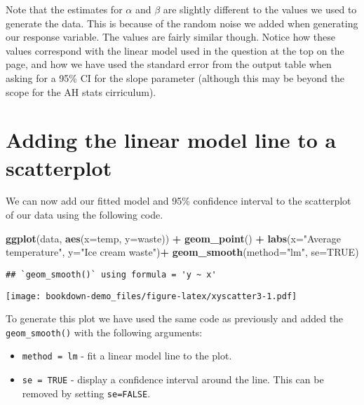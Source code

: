 \documentclass[
]{book}
\newenvironment{Shaded}{\begin{snugshade}}{\end{snugshade}}
\newcommand{\DataTypeTok}[1]{\textcolor[rgb]{0.13,0.29,0.53}{#1}}
\newcommand{\KeywordTok}[1]{\textcolor[rgb]{0.13,0.29,0.53}{\textbf{#1}}}
\newcommand{\NormalTok}[1]{#1}
\newcommand{\OperatorTok}[1]{\textcolor[rgb]{0.81,0.36,0.00}{\textbf{#1}}}
\newcommand{\OtherTok}[1]{\textcolor[rgb]{0.56,0.35,0.01}{#1}}
\newcommand{\StringTok}[1]{\textcolor[rgb]{0.31,0.60,0.02}{#1}}
\providecommand{\tightlist}{%
  \setlength{\itemsep}{0pt}\setlength{\parskip}{0pt}}
\begin{document}
Note that the estimates for \(\alpha\) and \(\beta\) are slightly different to the values we used to generate the data. This is because of the random noise we added when generating our response variable. The values are fairly similar though. Notice how these values correspond with the linear model used in the question at the top on the page, and how we have used the standard error from the output table when asking for a 95\% CI for the slope parameter (although this may be beyond the scope for the AH stats cirriculum).

\hypertarget{adding-the-linear-model-line-to-a-scatterplot}{%
\section{Adding the linear model line to a scatterplot}\label{adding-the-linear-model-line-to-a-scatterplot}}

We can now add our fitted model and 95\% confidence interval to the scatterplot of our data using the following code.

\begin{Shaded}
\begin{Highlighting}[]
\KeywordTok{ggplot}\NormalTok{(data, }\KeywordTok{aes}\NormalTok{(}\DataTypeTok{x=}\NormalTok{temp, }\DataTypeTok{y=}\NormalTok{waste)) }\OperatorTok{+}\StringTok{ }
\StringTok{  }\KeywordTok{geom_point}\NormalTok{() }\OperatorTok{+}\StringTok{ }
\StringTok{  }\KeywordTok{labs}\NormalTok{(}\DataTypeTok{x=}\StringTok{"Average temperature"}\NormalTok{, }\DataTypeTok{y=}\StringTok{"Ice cream waste"}\NormalTok{)}\OperatorTok{+}
\StringTok{  }\KeywordTok{geom_smooth}\NormalTok{(}\DataTypeTok{method=}\StringTok{"lm"}\NormalTok{, }\DataTypeTok{se=}\OtherTok{TRUE}\NormalTok{)}
\end{Highlighting}
\end{Shaded}

\begin{verbatim}
## `geom_smooth()` using formula = 'y ~ x'
\end{verbatim}

\texttt{[image: bookdown-demo\_files/figure-latex/xyscatter3-1.pdf]}

To generate this plot we have used the same code as previously and added the \texttt{geom\_smooth()} with the following arguments:

\begin{itemize}
\tightlist
\item
  \texttt{method\ =\ lm} - fit a linear model line to the plot.
\item
  \texttt{se\ =\ TRUE} - display a confidence interval around the line. This can be removed by setting \texttt{se=FALSE}.
\end{itemize}
\end{document}
